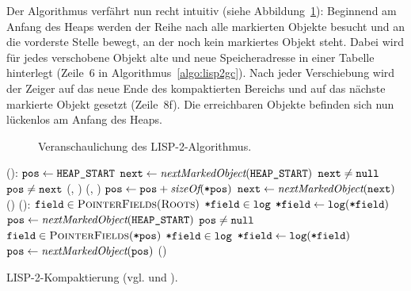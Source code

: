 Der Algorithmus verfährt nun recht intuitiv (siehe Abbildung~\ref{fig:lisp2}):
Beginnend am Anfang des Heaps werden der Reihe nach alle markierten Objekte besucht und an die vorderste Stelle bewegt, an der noch kein markiertes Objekt steht.
Dabei wird für jedes verschobene Objekt alte und neue Speicheradresse in einer Tabelle  hinterlegt (Zeile~6 in Algorithmus~\ref{algo:lisp2gc}).
Nach jeder Verschiebung wird der Zeiger  auf das neue Ende des kompaktierten Bereichs und  auf das nächste markierte Objekt gesetzt (Zeile~8f).
Die erreichbaren Objekte befinden sich nun lückenlos am Anfang des Heaps.

\newpage

\begin{figure}[H]
	\centering
	
	\caption[LISP-2-Algorithmus]{Veranschaulichung des LISP-2-Algorithmus.}
	\label{fig:lisp2}
\end{figure}

\vfill

\begin{algorithm}[h!]
\begin{algorithmic}[1]
	\State \Atomic {}():
	\State \quad $\texttt{pos} \gets \texttt{HEAP\_START}$	
	\State \quad $\texttt{next} \gets \textit{nextMarkedObject}(\texttt{HEAP\_START})$ 
	\State \quad \WHILE $\texttt{next} \neq \texttt{null}$			
	\State \quad \quad \IF $\texttt{pos} \neq \texttt{next}$	
	\State \quad \quad \quad {}(, )		
	\State \quad \quad \quad {}(, )	
	\State \quad \quad $\texttt{pos} \gets \texttt{pos} + \textit{sizeOf}(\texttt{*pos})$
	\State \quad \quad $\texttt{next} \gets \textit{nextMarkedObject}(\texttt{next})$
	\State \quad {}()
	\Statex
	\State {}():
	\State \quad \FOREACH $\texttt{field} \in \textsc{PointerFields}(\textsc{Roots})$
	\State \quad \quad \IF $\texttt{*field} \in \texttt{log}$ 
	\State \quad \quad \quad $\texttt{*field} \gets \texttt{log}(\texttt{*field})$
	\State \quad $\texttt{pos} \gets \textit{nextMarkedObject}(\texttt{HEAP\_START})$		
	\State \quad \WHILE $\texttt{pos} \neq \texttt{null}$
	\State \quad \quad \FOREACH $\texttt{field} \in \textsc{PointerFields}(\texttt{*pos})$
	\State \quad \quad \quad \IF $\texttt{*field} \in \texttt{log}$
	\State \quad \quad \quad \quad $\texttt{*field} \gets \texttt{log}(\texttt{*field})$
	\State \quad \quad $\texttt{pos} \gets \textit{nextMarkedObject}(\texttt{pos})$
	\State \quad {}()		
\end{algorithmic}
\caption[LISP-2-Kompaktierung]{LISP-2-Kompaktierung (vgl. \cite[S. 35]{handbook} und \cite[S. 7ff]{lisp2gc}).}
\label{algo:lisp2gc}
\end{algorithm}

